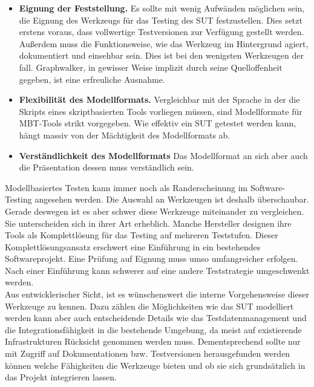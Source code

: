 \begin{itemize} 
\item\textbf{Eignung der Feststellung.} Es sollte mit wenig Aufwänden möglichen sein, die Eignung des Werkzeugs für das Testing des SUT festzustellen. Dies setzt erstens voraus, dass vollwertige Testversionen zur Verfügung gestellt werden. Außerdem muss die Funktionsweise, wie das Werkzeug im Hintergrund agiert, dokumentiert und einsehbar sein. Dies ist bei den wenigsten Werkzeugen der fall. Graphwalker, in gewisser Weise implizit durch seine Quelloffenheit gegeben, ist eine erfreuliche Ausnahme.
\item \textbf{Flexibilität des Modellformats.} Vergleichbar mit der Sprache in der die Skripts eines skriptbasierten Tools vorliegen müssen, sind Modellformate für MBT-Tools strikt vorgegeben. Wie effektiv ein SUT getestet werden kann, hängt massiv von der Mächtigkeit des Modellformats ab.
\item \textbf{Verständlichkeit des Modellformats} Das Modellformat an sich aber auch die Präsentation dessen muss verständlich sein.
\end{itemize}


Modellbasiertes Testen kann immer noch als Randerscheinung im Software-Testing angesehen werden. Die Auswahl an Werkzeugen ist deshalb überschaubar. Gerade deswegen ist es aber schwer diese Werkzeuge miteinander zu vergleichen. Sie unterscheiden sich in ihrer Art erheblich. Manche Hersteller designen ihre Tools als Komplettlösung für das Testing auf mehreren Teststufen. Dieser Komplettlösungsansatz erschwert eine Einführung in ein bestehendes Softwareprojekt. Eine Prüfung auf Eignung muss umso umfangreicher erfolgen. Nach einer Einführung kann schwerer auf eine andere Teststrategie umgeschwenkt werden.\\
Aus entwicklerischer Sicht, ist es wünschenswert die interne Vorgehensweise dieser Werkzeuge zu kennen. Dazu zählen die Möglichkeiten wie das SUT modelliert werden kann aber auch entscheidende Details wie das Testdatenmanagement und die Integrationsfähigkeit in die bestehende Umgebung, da meist auf existierende Infrastrukturen Rücksicht genommen werden muss. Dementsprechend sollte nur mit Zugriff auf Dokumentationen bzw. Testversionen herausgefunden werden können welche Fähigkeiten die Werkzeuge bieten und ob sie sich grundsätzlich in das Projekt integrieren lassen. 



